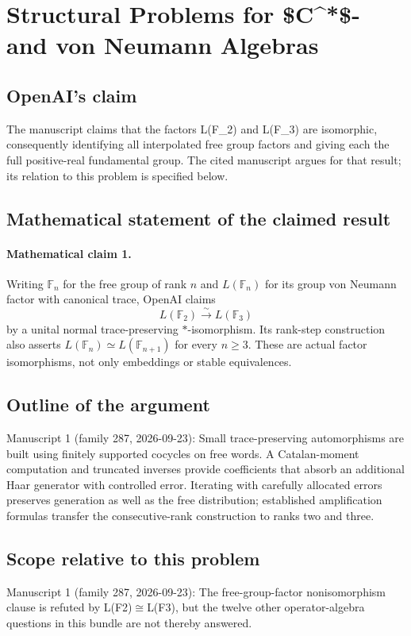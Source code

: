 \documentclass[11pt]{article}
\begin{document}
\section*{Structural Problems for \$C\textasciicircum{}*\$- and von Neumann Algebras}

\subsection{OpenAI's claim}
The manuscript claims that the factors L(F\_2) and L(F\_3) are isomorphic, consequently identifying all interpolated free group factors and giving each the full positive-real fundamental group. The cited manuscript argues for that result; its relation to this problem is specified below.

\subsection{Mathematical statement of the claimed result}
\paragraph{Mathematical claim 1.} Writing $\mathbb F_n$ for the free group of rank $n$ and $L(\mathbb F_n)$ for its group von Neumann factor with canonical trace, OpenAI claims
\[
L(\mathbb F_2)\xrightarrow{\sim}L(\mathbb F_3)
\]
by a unital normal trace-preserving $*$-isomorphism. Its rank-step construction also asserts $L(\mathbb F_n)\simeq L(\mathbb F_{n+1})$ for every $n\ge3$. These are actual factor isomorphisms, not only embeddings or stable equivalences.

\subsection{Outline of the argument}
Manuscript 1 (family 287, 2026-09-23): Small trace-preserving automorphisms are built using finitely supported cocycles on free words. A Catalan-moment computation and truncated inverses provide coefficients that absorb an additional Haar generator with controlled error. Iterating with carefully allocated errors preserves generation as well as the free distribution; established amplification formulas transfer the consecutive-rank construction to ranks two and three.

\subsection{Scope relative to this problem}
Manuscript 1 (family 287, 2026-09-23): The free-group-factor nonisomorphism clause is refuted by L(F2)\(\cong\)L(F3), but the twelve other operator-algebra questions in this bundle are not thereby answered.
\end{document}

